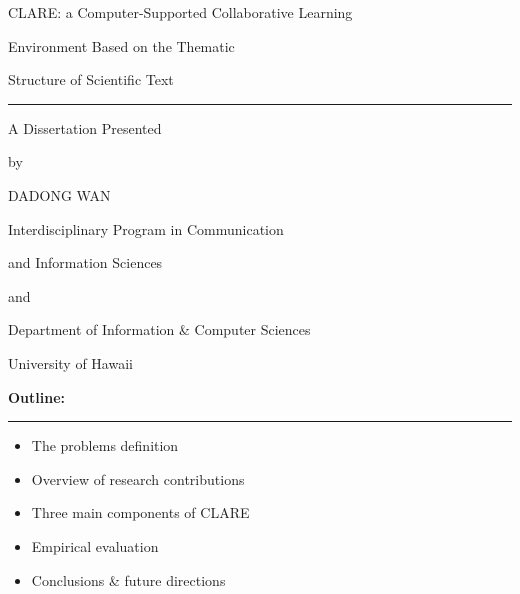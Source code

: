 
\newcommand{\horizontalline} {\rule{\textwidth}{.05in}}
\pagestyle{empty}

\sloppy


\begin{slide} \Huge 
  \begin{center}
    CLARE: a Computer-Supported Collaborative Learning

    Environment Based on the Thematic

    Structure of Scientific Text

   {\rule{2.0in}{.02in}}
 
   A Dissertation Presented 

    
    by

    DADONG WAN

    \vspace{0.5in}

   Interdisciplinary Program in Communication

   and Information Sciences

   and
     
    Department of Information \& Computer Sciences
    
    University of Hawaii
  \end{center}
\end{slide} \Huge  


\begin{slide} \Huge 
  {\bf Outline:}
  \horizontalline
  
  \begin{itemize}
  \item The problems definition
      
  \item Overview of research contributions

  \item Three main components of CLARE

  \item Empirical evaluation

  \item Conclusions \& future directions
    \end{itemize}
\end{slide} \Huge



